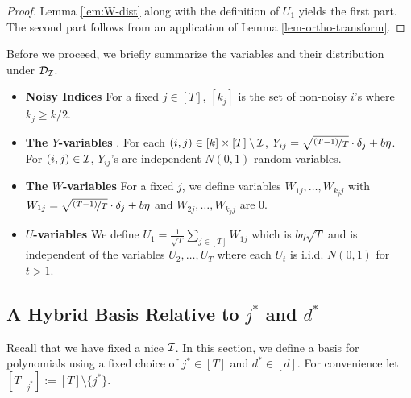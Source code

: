 \begin{proof}
Lemma \ref{lem:W-dist} along with the definition of $U_1$ yields the first part. 
The second part follows from an application of  Lemma \ref{lem-ortho-transform}.
\end{proof}
Before we proceed, we briefly summarize the variables and their
distribution under $\mathcal{D}_{\mathcal{I}}$.


\begin{itemize}
	\item {\bf Noisy Indices} For a fixed $j \in [T]$, $[k_j]$ is the set of non-noisy $i$'s where $k_j \geq k/2$.
	\item {\bf The $Y$-variables} . For each $(i,j) \in [k] \times [T] \setminus\mathcal{I}$, $Y_{ij} =  \sqrt{\nicefrac{(T-1)}{T}}\cdot\delta_j +b\eta$. For $(i,j) \in \mathcal{I}$, $Y_{ij}$'s are independent $N(0,1)$ random variables. 
	\item {\bf The $W$-variables} For a fixed $j$, we define variables $W_{1j},\ldots,W_{k_jj}$ with $W_{1j} =  \sqrt{\nicefrac{(T-1)}{T}}\cdot\delta_j + b\eta$ and $W_{2j},\ldots,W_{{k_j}j}$ are $0$. 
	\item {\bf $U$-variables} We define $U_1 = \frac{1}{\sqrt{T}}\sum_{j \in [T]}W_{1j}$ which is $b\eta\sqrt{T}$ and is independent of the 
variables $U_2,\ldots,U_T$ where each $U_t$ is i.i.d. $N(0,1)$ for $t>1$.
\end{itemize}


\subsection{A Hybrid Basis Relative to $j^*$ and $d^*$}\label{sec:hybrid}
Recall that we have fixed a nice $\mathcal{I}$. In this section, we define a basis for polynomials using a fixed choice of $j^* \in [T]$ and $d^* \in [d]$.  For convenience let $[T_{-j^*}] := [T]\setminus\{j^*\}$.

